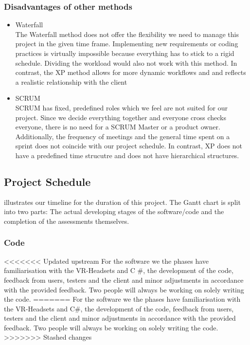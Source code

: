 \documentclass[coverpage,lineno]{../custom}
\begin{document}
\subsubsection{Disadvantages of other methods}
\begin{itemize}
    \item Waterfall \\
    The Waterfall method does not offer the flexibility we need to manage this project in the given time frame. Implementing new requirements or coding practices is virtually impossible because everything has to stick to a rigid schedule. Dividing the workload would also not work with this method. In contrast, the XP method allows for more dynamic workflows and and reflects a realistic relationship with the client
    \item SCRUM \\
    SCRUM has fixed, predefined roles which we feel are not suited for our project. Since we decide everything together and everyone cross checks everyone, there is no need for a SCRUM Master or a product owner. Additionally, the frequency of meetings and the general time spent on a sprint does not coincide with our project schedule. In contrast, XP does not have a predefined time strucutre and does not have hierarchical structures.   
    
    
\end{itemize}

\subsection{Project Schedule}
\label{ssec:schedule}

 illustrates our timeline for the duration of this project. The Gantt chart is split into two parts: The actual developing stages of the software/code and the completion of the assessments themselves. 
\subsubsection{Code}
<<<<<<< Updated upstream
For the software we the phases have familiarisation with the VR-Headsets and C \#, the development of the code, feedback from users, testers and the client and minor adjustments in accordance with the provided feedback. Two people will always be working on solely writing the code. 
=======
For the software we the phases have familiarisation with the VR-Headsets and C\#, the development of the code, feedback from users, testers and the client and minor adjustments in accordance with the provided feedback. Two people will always be working on solely writing the code. 
>>>>>>> Stashed changes
\end{document}
